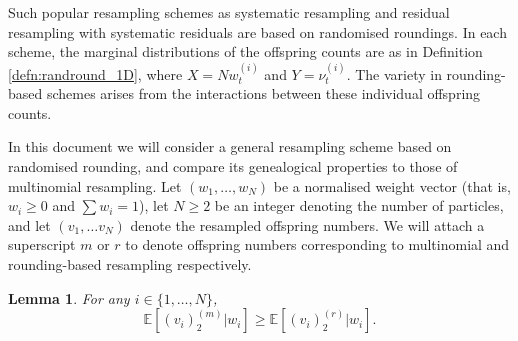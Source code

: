 \documentclass[fleqn]{article}
\newtheorem{lemma}{Lemma}
\theoremstyle{definition}
\newcommand{\E}{\mathbb{E}}
\newcommand{\vt}[2][t]{\nu_{#1}^{(#2)}}
\newcommand{\wt}[2][t]{w_{#1}^{(#2)}}
\begin{document}
Such popular resampling schemes as systematic resampling and residual resampling with systematic residuals are based on randomised roundings. In each scheme, the marginal distributions of the offspring counts are as in Definition \ref{defn:randround_1D}, where $X=N\wt{i}$ and $Y=\vt{i}$. The variety in rounding-based schemes arises from the interactions between these individual offspring counts. 

In this document we will consider a general resampling scheme based on randomised rounding, and compare its genealogical properties to those of multinomial resampling.
Let $(w_1, \dots, w_N)$ be a normalised weight vector (that is, $w_i \geq 0$ and $\sum w_i = 1$), let $N\geq 2$ be an integer denoting the number of particles, and let $(v_1,\dots v_N)$ denote the resampled offspring numbers. We will attach a superscript $m$ or $r$ to denote offspring numbers corresponding to multinomial and rounding-based resampling respectively.

\begin{lemma}
For any $i \in \{1, \dots, N\}$,
\begin{equation*}
\E[(v_i)_2^{(m)} | w_i] \geq \E[(v_i)_2^{(r)} | w_i].
\end{equation*}
\end{lemma}
\end{document}
